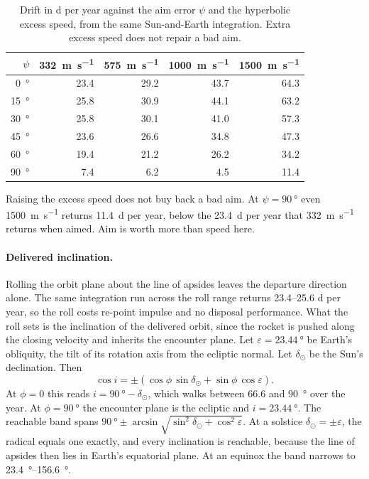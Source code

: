 \documentclass{article}
\begin{document}
\begin{table}[!htpb]
    \centering
    \caption{Drift in \si{\day} per year against the aim error $\psi$ and the hyperbolic excess speed, from the same Sun-and-Earth integration. Extra excess speed does not repair a bad aim.}
    \label{tab:departure_aim}
    \begin{tabular}{|r|r|r|r|r|}
        \hline
        $\psi$ & \SI{332}{\meter\per\second} & \SI{575}{\meter\per\second} & \SI{1000}{\meter\per\second} & \SI{1500}{\meter\per\second} \\\hline
        \SI{0}{\degree}   & 23.4 & 29.2 & 43.7 & 64.3 \\\hline
        \SI{15}{\degree}  & 25.8 & 30.9 & 44.1 & 63.2 \\\hline
        \SI{30}{\degree}  & 25.8 & 30.1 & 41.0 & 57.3 \\\hline
        \SI{45}{\degree}  & 23.6 & 26.6 & 34.8 & 47.3 \\\hline
        \SI{60}{\degree}  & 19.4 & 21.2 & 26.2 & 34.2 \\\hline
        \SI{90}{\degree}  &  7.4 &  6.2 &  4.5 & 11.4 \\\hline
    \end{tabular}
\end{table}

Raising the excess speed does not buy back a bad aim. At $\psi = \SI{90}{\degree}$ even \SI{1500}{\meter\per\second} returns \SI{11.4}{\day} per year, below the \SI{23.4}{\day} per year that \SI{332}{\meter\per\second} returns when aimed. Aim is worth more than speed here.

\paragraph{Delivered inclination.}
Rolling the orbit plane about the line of apsides leaves the departure direction alone. The same integration run across the roll range returns \SIrange{23.4}{25.6}{} \si{\day} per year, so the roll costs re-point impulse and no disposal performance. What the roll sets is the inclination of the delivered orbit, since the rocket is pushed along the closing velocity and inherits the encounter plane. Let $\varepsilon = \SI{23.44}{\degree}$ be Earth's obliquity, the tilt of its rotation axis from the ecliptic normal. Let $\delta_\odot$ be the Sun's declination. Then
\begin{equation}
\cos i = \pm\left(\cos\phi\,\sin\delta_\odot + \sin\phi\,\cos\varepsilon\right).
\label{eq:departure_inclination}
\end{equation}
At $\phi = 0$ this reads $i = \SI{90}{\degree} - \delta_\odot$, which walks between \SI{66.6}{} and \SI{90}{\degree} over the year. At $\phi = \SI{90}{\degree}$ the encounter plane is the ecliptic and $i = \SI{23.44}{\degree}$. The reachable band spans $\SI{90}{\degree} \pm \arcsin\sqrt{\sin^{2}\delta_\odot + \cos^{2}\varepsilon}$. At a solstice $\delta_\odot = \pm\varepsilon$, the radical equals one exactly, and every inclination is reachable, because the line of apsides then lies in Earth's equatorial plane. At an equinox the band narrows to \SIrange{23.4}{156.6}{\degree}.
\end{document}
